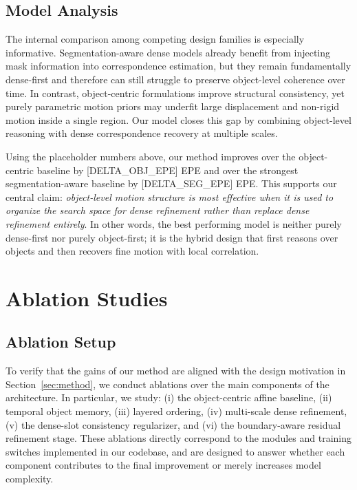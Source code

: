 \subsection{Model Analysis}

The internal comparison among competing design families is especially informative. Segmentation-aware dense models already benefit from injecting mask information into correspondence estimation, but they remain fundamentally dense-first and therefore can still struggle to preserve object-level coherence over time. In contrast, object-centric formulations improve structural consistency, yet purely parametric motion priors may underfit large displacement and non-rigid motion inside a single region. Our model closes this gap by combining object-level reasoning with dense correspondence recovery at multiple scales.

Using the placeholder numbers above, our method improves over the object-centric baseline by [DELTA\_OBJ\_EPE] EPE and over the strongest segmentation-aware baseline by [DELTA\_SEG\_EPE] EPE. This supports our central claim: \emph{object-level motion structure is most effective when it is used to organize the search space for dense refinement rather than replace dense refinement entirely}. In other words, the best performing model is neither purely dense-first nor purely object-first; it is the hybrid design that first reasons over objects and then recovers fine motion with local correlation.

\section{Ablation Studies}
\label{sec:ablation}

\subsection{Ablation Setup}

To verify that the gains of our method are aligned with the design motivation in Section~\ref{sec:method}, we conduct ablations over the main components of the architecture. In particular, we study: (i) the object-centric affine baseline, (ii) temporal object memory, (iii) layered ordering, (iv) multi-scale dense refinement, (v) the dense-slot consistency regularizer, and (vi) the boundary-aware residual refinement stage. These ablations directly correspond to the modules and training switches implemented in our codebase, and are designed to answer whether each component contributes to the final improvement or merely increases model complexity.

